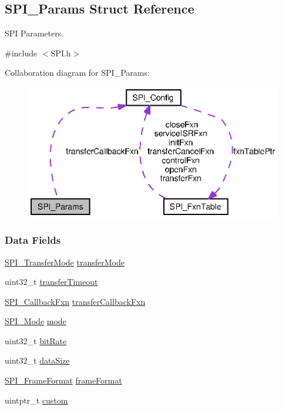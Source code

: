 \subsection{S\+P\+I\+\_\+\+Params Struct Reference}
\label{struct_s_p_i___params}


S\+P\+I Parameters.  




{\ttfamily \#include $<$S\+P\+I.\+h$>$}



Collaboration diagram for S\+P\+I\+\_\+\+Params\+:
\nopagebreak
\begin{figure}[H]
\begin{center}
\leavevmode
\includegraphics[width=344pt]{struct_s_p_i___params__coll__graph}
\end{center}
\end{figure}
\subsubsection*{Data Fields}
\begin{DoxyCompactItemize}
\item 
\hyperlink{_s_p_i_8h_ab9ea76c6529d6076eee5e1c4a5a92c6f}{S\+P\+I\+\_\+\+Transfer\+Mode} \hyperlink{struct_s_p_i___params_a16dbcc3768a01fb7deae25b48fc0d69c}{transfer\+Mode}
\item 
uint32\+\_\+t \hyperlink{struct_s_p_i___params_a600801907cf396a96825eaf69781913a}{transfer\+Timeout}
\item 
\hyperlink{_s_p_i_8h_a207e2d5a7e7ea5606b6995b6485ca015}{S\+P\+I\+\_\+\+Callback\+Fxn} \hyperlink{struct_s_p_i___params_a68d1d610da6a6bf299121b939ef2a352}{transfer\+Callback\+Fxn}
\item 
\hyperlink{_s_p_i_8h_a60a7e3d74577b38aa79ea6983362f942}{S\+P\+I\+\_\+\+Mode} \hyperlink{struct_s_p_i___params_abe5eca64adf4ca96bed206a271d9b157}{mode}
\item 
uint32\+\_\+t \hyperlink{struct_s_p_i___params_ab3f035044fdbe75adac8c1d729d8cf20}{bit\+Rate}
\item 
uint32\+\_\+t \hyperlink{struct_s_p_i___params_a30722b1de5e3b089ecf0c669da42ed2d}{data\+Size}
\item 
\hyperlink{_s_p_i_8h_a4e1f33555dfa8147205af5b266f3a489}{S\+P\+I\+\_\+\+Frame\+Format} \hyperlink{struct_s_p_i___params_a67b5ebb8ec72796a0260c427c91cc093}{frame\+Format}
\item 
uintptr\+\_\+t \hyperlink{struct_s_p_i___params_a38e4637f2ff1083cc6de3f600632a0da}{custom}
\end{DoxyCompactItemize}



